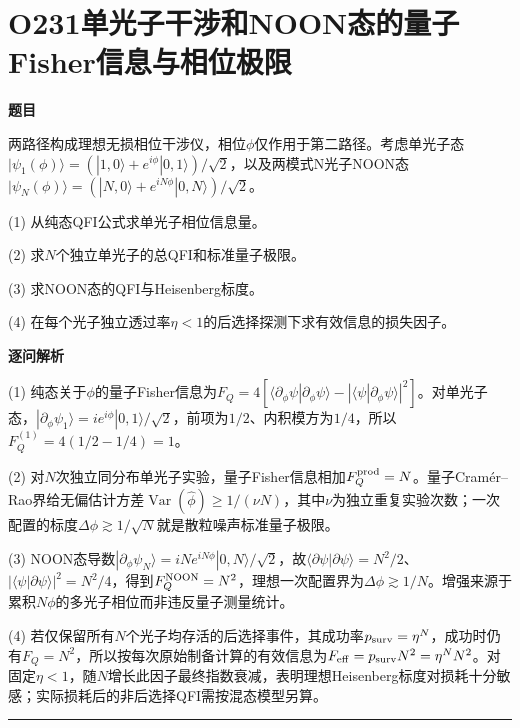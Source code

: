 \documentclass[UTF8,a4paper,11pt,oneside,openany]{ctexbook}
\begin{document}
\section*{O231\quad 单光子干涉和NOON态的量子Fisher信息与相位极限}
\textbf{题目}\par
两路径构成理想无损相位干涉仪，相位$\phi$仅作用于第二路径。考虑单光子态$|\psi_1(\phi)\rangle=(|1,0\rangle+e^{i\phi}|0,1\rangle)/\sqrt2$，以及两模式N光子NOON态$|\psi_N(\phi)\rangle=(|N,0\rangle+e^{iN\phi}|0,N\rangle)/\sqrt2$。
\par\smallskip\noindent (1) 从纯态QFI公式求单光子相位信息量。
\par\smallskip\noindent (2) 求$N$个独立单光子的总QFI和标准量子极限。
\par\smallskip\noindent (3) 求NOON态的QFI与Heisenberg标度。
\par\smallskip\noindent (4) 在每个光子独立透过率$\eta<1$的后选择探测下求有效信息的损失因子。
\par\medskip\textbf{逐问解析}\par
\par\smallskip\noindent (1) 纯态关于$\phi$的量子Fisher信息为$F_Q=4[\langle\partial_\phi\psi|\partial_\phi\psi\rangle-|\langle\psi|\partial_\phi\psi\rangle|^2]$。对单光子态，$|\partial_\phi\psi_1\rangle=ie^{i\phi}|0,1\rangle/\sqrt2$，前项为$1/2$、内积模方为$1/4$，所以$F_Q^{(1)}=4(1/2-1/4)=1$。
\par\smallskip\noindent (2) 对$N$次独立同分布单光子实验，量子Fisher信息相加$F_Q^{\rm prod}=N$。量子Cramér–Rao界给无偏估计方差$\operatorname{Var}(\hat\phi)\ge1/(\nu N)$，其中$\nu$为独立重复实验次数；一次配置的标度$\Delta\phi\gtrsim1/\sqrt N$就是散粒噪声标准量子极限。
\par\smallskip\noindent (3) NOON态导数$|\partial_\phi\psi_N\rangle=iNe^{iN\phi}|0,N\rangle/\sqrt2$，故$\langle\partial\psi|\partial\psi\rangle=N^2/2$、$|\langle\psi|\partial\psi\rangle|^2=N^2/4$，得到$F_Q^{\rm NOON}=N^2$，理想一次配置界为$\Delta\phi\gtrsim1/N$。增强来源于累积$N\phi$的多光子相位而非违反量子测量统计。
\par\smallskip\noindent (4) 若仅保留所有$N$个光子均存活的后选择事件，其成功率$p_{\rm surv}=\eta^N$，成功时仍有$F_Q=N^2$，所以按每次原始制备计算的有效信息为$F_{\rm eff}=p_{\rm surv}N^2=\eta^N N^2$。对固定$\eta<1$，随$N$增长此因子最终指数衰减，表明理想Heisenberg标度对损耗十分敏感；实际损耗后的非后选择QFI需按混态模型另算。
\par\medskip\hrule\medskip
\end{document}
